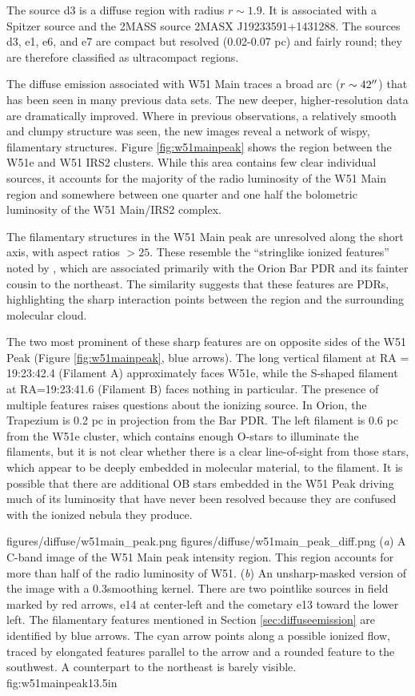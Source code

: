 The source d3 is a diffuse \hii region with radius $r\sim1.9$\arcsec.  It is
associated with a Spitzer source and the 2MASS source 2MASX J19233591+1431288.
The sources d3, e1, e6, and e7 are compact but resolved (0.02-0.07 pc) and
fairly round; they are therefore classified as ultracompact \hii regions.

The diffuse emission associated with W51 Main traces a broad arc
($r\sim42\mbox{$^{\prime\prime}$}$) that has been seen in many previous data sets.  The new
deeper, higher-resolution data are dramatically improved.  Where in previous
observations, a relatively smooth and clumpy structure was seen, the new images
reveal a network of wispy, filamentary structures.  Figure
\ref{fig:w51mainpeak} shows the region between the W51e and W51 IRS2 clusters.
While this area contains few clear individual sources, it accounts for the
majority of the radio luminosity of the W51 Main region and somewhere between
one quarter and one half the bolometric luminosity of the W51 Main/IRS2 complex.

The filamentary structures in the W51 Main peak are unresolved along the short
axis, with aspect ratios $>25$.   These resemble the ``stringlike ionized
features'' noted by \citet[][see
\url{http://images.nrao.edu/402}]{Yusef-Zadeh1990a}, which are associated
primarily with the Orion Bar PDR and its fainter cousin to the northeast.  The
similarity suggests that these features are PDRs, highlighting the sharp
interaction points between the \hii region and the surrounding molecular cloud.

The two most prominent of these sharp features are on opposite sides of the W51
Peak (Figure \ref{fig:w51mainpeak}, blue arrows).  The long vertical filament
at RA = 19:23:42.4 (Filament A) approximately faces W51e, while the S-shaped
filament at RA=19:23:41.6 (Filament B) faces nothing in particular.  The
presence of multiple features raises questions about the ionizing source.  In
Orion, the Trapezium is 0.2 pc in projection from the Bar PDR.  The left
filament is 0.6 pc from the W51e cluster, which contains enough O-stars to
illuminate the filaments, but it is not clear whether there is a clear
line-of-sight from those stars, which appear to be deeply embedded in molecular
material, to the filament.  It is possible that there are additional OB stars
embedded in the W51 Peak driving much of its luminosity that have never been
resolved because they are confused with the ionized nebula they produce.

\FigureTwo
{figures/diffuse/w51main_peak.png}
{figures/diffuse/w51main_peak_diff.png}
{({\it a}) A C-band image of the W51 Main peak intensity region.  This region
accounts for more than half of the radio luminosity of W51.
({\it b}) An unsharp-masked version of the image with a 0.3\arcsec smoothing
kernel. 
There are
two pointlike sources in field marked by red arrows, e14 at center-left and the
cometary e13 toward the lower left.
The filamentary features mentioned in Section \ref{sec:diffuseemission} are
identified by blue arrows.  The cyan arrow points along a possible ionized flow,
traced by elongated features parallel to the arrow and a rounded feature to the
southwest.  A counterpart to the northeast is barely visible.
}
{fig:w51mainpeak}{1}{3.5in}


